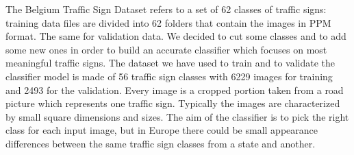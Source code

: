 The Belgium Traffic Sign Dataset refers to a set of 62 classes of traffic signs: training data files are divided into 62 folders that contain the images in PPM format. The same for validation data. We decided to cut some classes and to add some new ones in order to build an accurate classifier which focuses on most meaningful traffic signs. The dataset we have used to train and to validate the classifier model is made of 56 traffic sign classes with 6229 images for training and 2493 for the validation. Every image is a cropped portion taken from a road picture which represents one traffic sign. Typically the images are characterized by small square dimensions and sizes. The aim of the classifier is to pick the right class for each input image, but in Europe there could be small appearance differences between the same traffic sign classes from a state and another. 
